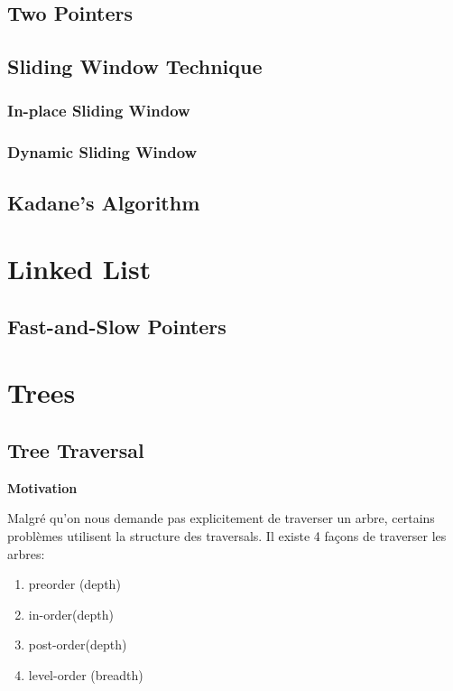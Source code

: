 \documentclass{article}
\begin{document}
\subsection{Two Pointers}%
\label{sub:Two Pointers}

\subsection{Sliding Window Technique}%
\label{sub:Sliding Window Technique}

\subsubsection{In-place Sliding Window}%
\label{ssub:In-place Sliding Window}

\subsubsection{Dynamic Sliding Window}%
\label{ssub:Dynamic Sliding Window}

\subsection{Kadane's Algorithm}%
\label{sub:Kadane's Algorithm}

\section{Linked List}%
\label{sec:Linked List}

\subsection{Fast-and-Slow Pointers}%
\label{sub:Fast-and-Slow Pointers}

\section{Trees}%
\label{sec:Trees}

\subsection{Tree Traversal}%
\label{sub:Tree Traversal}

\textbf{Motivation}

Malgré qu'on nous demande pas explicitement de traverser un arbre, certains
problèmes utilisent la structure des traversals. Il existe 4 façons de
traverser les arbres:
\begin{enumerate}
    \item preorder (depth)
    \item in-order(depth)
    \item post-order(depth)
    \item level-order (breadth)
\end{enumerate}
\end{document}
